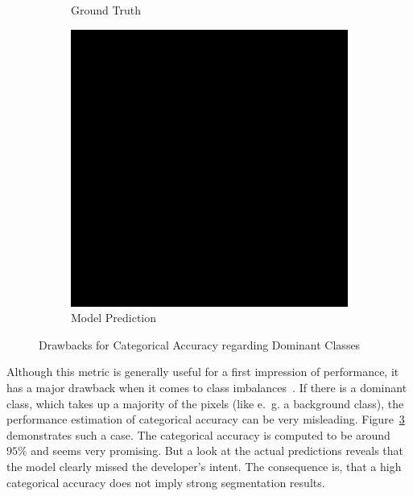 \begin{figure}[h]
\begin{subfigure}{\CategoricalAccuracyImageWidth}
        \caption{Ground Truth}
        \label{fig:ca_truth}
    \end{subfigure}
    \hfill
    \begin{subfigure}{\CategoricalAccuracyImageWidth}
        \includegraphics[width=\textwidth]{images/categorical_accuracy_prediction}
        \caption{Model Prediction}
        \label{fig:ca_prediction}
    \end{subfigure}
    \hfill
    \caption[Drawbacks for Categorical Accuracy regarding Dominant Classes]{Drawbacks for Categorical Accuracy regarding Dominant Classes~\cite{tds_segmentation18}}
    \label{fig:categorical_accuracy_drawbacks}
\end{figure}

Although this metric is generally useful for a first impression of performance, it has a major drawback when it comes to class imbalances~\cite{tds_segmentation18}. If there is a dominant class, which takes up a majority of the pixels (like e.~g. a background class), the performance estimation of categorical accuracy can be very misleading. Figure~\ref{fig:categorical_accuracy_drawbacks} demonstrates such a case. The categorical accuracy is computed to be around $95\%$ and seems very promising. But a look at the actual predictions reveals that the model clearly missed the developer's intent. The consequence is, that a high categorical accuracy does not imply strong segmentation results.

